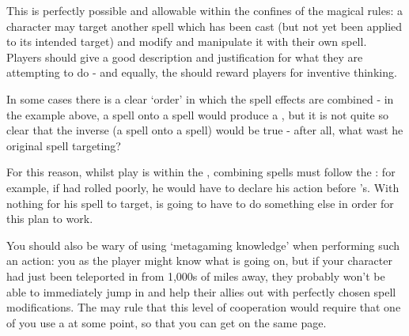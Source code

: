 This is perfectly possible and allowable within the confines of the magical rules: a character may target another spell which has been cast (but not yet been applied to its intended target) and modify and manipulate it with their own spell. Players should give a good description and justification for what they are attempting to do - and equally, the  should reward players for inventive thinking. 

In some cases there is a clear `order' in which the spell effects are combined - in the example above, a  spell onto a  spell would produce a , but it is not quite so clear that the inverse (a  spell onto a  spell) would be true - after all, what wast he original  spell targeting? 

For this reason, whilst play is within the , combining spells must follow the : for example, if  had rolled poorly, he would have to declare his action before 's. With nothing for his  spell to target,  is going to have to do something else in order for this plan to work. 

You should also be wary of using `metagaming knowledge' when performing such an action: you as the player might know what is going on, but if your character had just been teleported in from 1,000s of miles away, they probably won't be able to immediately jump in and help their allies out with perfectly chosen spell modifications. The  may rule that this level of cooperation would require that one of you use a  at some point, so that you can get on the same page. 
